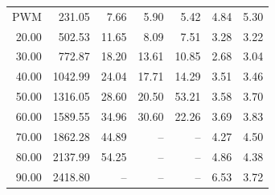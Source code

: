 \begin{tabular}{@{}rrrrrrr@{}}
\toprule
PWM %
\midrule
10.00 & 231.05 & 7.66 & 5.90 & 5.42 & 4.84 & 5.30 \\
20.00 & 502.53 & 11.65 & 8.09 & 7.51 & 3.28 & 3.22 \\
30.00 & 772.87 & 18.20 & 13.61 & 10.85 & 2.68 & 3.04 \\
40.00 & 1042.99 & 24.04 & 17.71 & 14.29 & 3.51 & 3.46 \\
50.00 & 1316.05 & 28.60 & 20.50 & 53.21 & 3.58 & 3.70 \\
60.00 & 1589.55 & 34.96 & 30.60 & 22.26 & 3.69 & 3.83 \\
70.00 & 1862.28 & 44.89 & -- & -- & 4.27 & 4.50 \\
80.00 & 2137.99 & 54.25 & -- & -- & 4.86 & 4.38 \\
90.00 & 2418.80 & -- & -- & -- & 6.53 & 3.72 \\
\bottomrule
\end{tabular}
